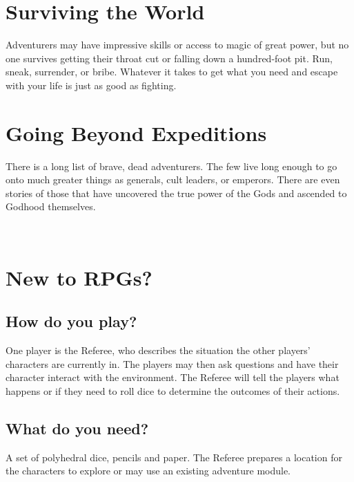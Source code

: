 \documentclass[itdr]{subfiles}
\begin{document}
\vfill
\break

\section*{Surviving the World}

Adventurers may have impressive skills or access to magic of great power, but no one survives getting their throat cut or falling down a hundred-foot pit. Run, sneak, surrender, or bribe. Whatever it takes to get what you need and escape with your life is just as good as fighting.

\section*{Going Beyond Expeditions}
There is a long list of brave, dead adventurers. The few live long enough to go onto much greater things as generals, cult leaders, or emperors. There are even stories of those that have uncovered the true power of the Gods and ascended to Godhood themselves.

~\\

\section*{New to RPGs?}

\subsection*{How do you play?}
One player is the Referee, who describes the situation the other players' characters are currently in. The players may then ask questions and have their character interact with the environment. The Referee will tell the players what happens or if they need to roll dice to determine the outcomes of their actions.

\subsection*{What do you need?}
A set of polyhedral dice, pencils and paper. The Referee prepares a location for the characters to explore or may use an existing adventure module.
\end{document}
